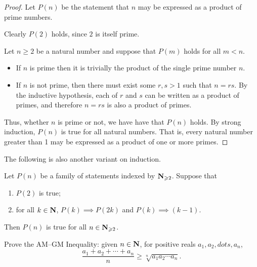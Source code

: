 \begin{proof}
Let $P(n)$ be the statement that $n$ may be expressed as a product of prime numbers. 

Clearly $P(2)$ holds, since $2$ is itself prime. 

Let $n \ge 2$ be a natural number and suppose that $P(m)$ holds for all $m<n$.

\begin{itemize}
\item If $n$ is prime then it is trivially the product of the single prime number $n$. 

\item If $n$ is not prime, then there must exist some $r, s > 1$ such that $n = rs$. By the inductive hypothesis, each of $r$ and $s$ can be written as a product of primes, and therefore $n = rs$ is also a product of primes.
\end{itemize}

Thus, whether $n$ is prime or not, we have have that $P(n)$ holds. By strong induction, $P(n)$ is true for all natural numbers. That is, every natural number greater than 1 may be expressed as a product of one or more primes.
\end{proof}

The following is also another variant on induction.

\begin{theorem}
Let $P(n)$ be a family of statements indexed by $\mathbf N_{\geqslant2}$. Suppose that
\begin{enumerate}[label=(\roman*)]
\item $P(2)$ is true;
\item for all $k\in\mathbf N$, $P(k)\implies P(2k)$ and $P(k)\implies (k-1)$.
\end{enumerate}
Then $P(n)$ is true for all $n\in\mathbf N_{\geqslant2}$.
\end{theorem}

\begin{exercise}
Prove the AM--GM Inequality: given $n\in\mathbf N$, for positive reals $a_1,a_2,dots,a_n$,
\[\frac{a_1+a_2+\cdots+a_n}{n}\ge\sqrt[n]{a_1a_2\cdots a_n}.\]
\end{exercise}

